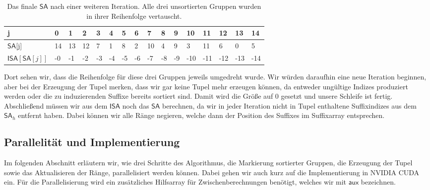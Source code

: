 \begin{table}[]
\begin{tabular}{|l|l|l|l|l|l|l|l|l|l|l|l|l|l|l|l|}
\hline
j                              & 0  & 1  & 2  & 3  & 4  & 5  & 6  & 7  & 8  & 9  & 10  & 11  & 12  & 13  & 14  \\ \hline
$\mathsf{SA}$[j]               & 14 & 13 & 12 & 7  & 1  & 8  & 2  & 10 & 4  & 9  & 3   & 11  & 6   & 0   & 5   \\ \hline
$\mathsf{ISA}[\mathsf{SA}[j]]$ & -0 & -1 & -2 & -3 & -4 & -5 & -6 & -7 & -8 & -9 & -10 & -11 & -12 & -13 & -14 \\ \hline
\end{tabular}
\caption{Das finale $\mathsf{SA}$ nach einer weiteren Iteration. Alle drei unsortierten Gruppen wurden in ihrer Reihenfolge vertauscht.}
\label{tab:osipov-final}
\end{table}

Dort sehen wir, dass die Reihenfolge für diese drei Gruppen jeweils umgedreht wurde. Wir würden daraufhin eine neue Iteration beginnen, aber bei der Erzeugung der Tupel merken, dass wir gar keine Tupel mehr erzeugen können, da entweder ungültige Indizes produziert werden oder die zu induzierenden Suffixe bereits sortiert sind. Damit wird die Größe auf 0 gesetzt und unsere Schleife ist fertig. Abschließend müssen wir aus dem $\mathsf{ISA}$ noch das $\mathsf{SA}$ berechnen, da wir in jeder Iteration nicht in Tupel enthaltene Suffixindizes aus dem $\mathsf{SA}_h$ entfernt haben. Dabei können wir alle Ränge negieren, welche dann der Position des Suffixes im Suffixarray entsprechen.


\subsection{Parallelität und Implementierung}
Im folgenden Abschnitt erläutern wir, wie drei Schritte des Algorithmus, die Markierung sortierter Gruppen, die Erzeugung der Tupel sowie das Aktualisieren der Ränge, parallelisiert werden können. Dabei gehen wir auch kurz auf die Implementierung in NVIDIA CUDA ein.
Für die Parallelisierung wird ein zusätzliches Hilfsarray für Zwischenberechnungen benötigt, welches wir mit $\mathsf{aux}$ bezeichnen.

